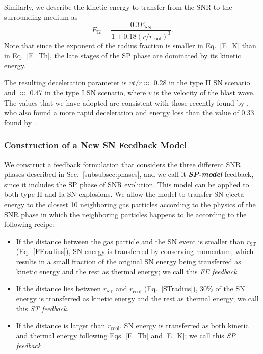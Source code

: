 \documentclass[iop]{emulateapj}
\begin{document}
Similarly, we describe the kinetic energy to transfer from the SNR to the surrounding medium as
\begin{equation}\label{E_K}
  E_{\mathrm{K}} = \frac{0.3 E_{\mathrm{SN}}}{1 + 0.18(r / r_{\mathrm{cool}})^3}.
\end{equation}
Note that since the exponent of the radius fraction is smaller in Eq.~\ref{E_K} than in Eq.~\ref{E_Th}, the late stages of the SP phase are dominated by its kinetic energy.

The resulting deceleration parameter is $vt/r\approx$ 0.28 in the type II SN scenario and $\approx$ 0.47 in the type I SN scenario, where $v$ is the velocity of the blast wave. The values that we have adopted are consistent with those recently found by \citet{Kim15} \citep[see also][]{Walch15, Martizzi15}, who also found a more rapid deceleration and energy loss than the value of 0.33 found by \cite{Blondin98} \citep[see also][for ISM simulations accounting for the effect of feedback during the SP phase]{Walch15, Girichidis16}.

\subsubsection{Construction of a New SN Feedback Model}\label{subsubsec:implementation}
We construct a feedback formulation that considers the three different SNR phases described in Sec.~\ref{subsubsec:phases}, and we call it \textbf{\textit{SP-model}} feedback, since it includes the SP phase of SNR evolution. This model can be applied to both type II and Ia SN explosions. We allow the model to transfer SN ejecta energy to the closest 10 neighboring gas particles according to the physics of the SNR phase in which the neighboring particles happens to lie according to the following recipe:
\begin{itemize}
\item If the distance between the gas particle and the SN event is smaller than $r_{\mathrm{ST}}$ (Eq.~\ref{FEradius}), SN energy is transferred by conserving momentum, which results in a small fraction of the original SN energy being transferred as kinetic energy and the rest as thermal energy; we call this \textit{FE feedback}.
\item If the distance lies between $r_{\mathrm{ST}}$ and $r_{\mathrm{cool}}$ (Eq.~\ref{STradius}), 30\% of the SN energy is transferred as kinetic energy and the rest as thermal energy; we call this \textit{ST feedback}.
\item If the distance is larger than $r_{\mathrm{cool}}$, SN energy is transferred as both kinetic and thermal energy following Eqs. \ref{E_Th} and \ref{E_K}; we call this \textit{SP feedback}.
\end{itemize}
\end{document}

